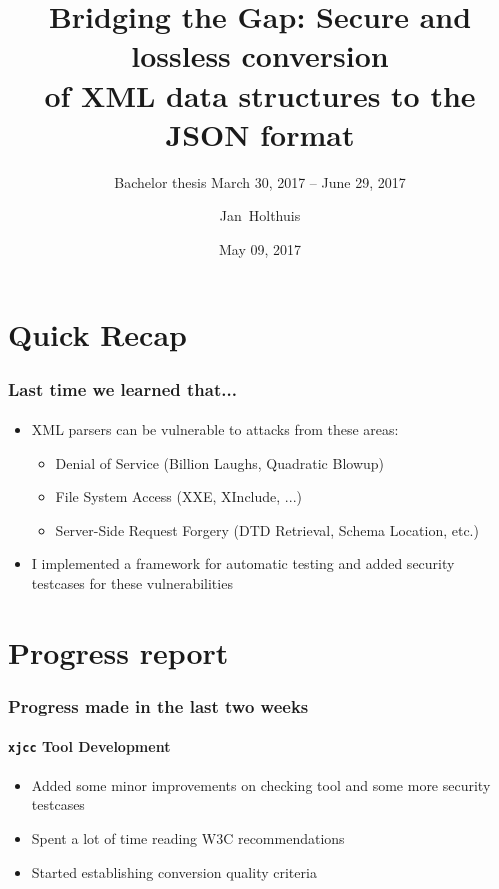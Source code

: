 \documentclass[
    alternativetitlepage=alternativ,
    cornerlogo=hgi_nds_logo2,
    sectionoverview,
]{rubpresentation}
\title[XML/JSON conversions]
{Bridging the Gap: Secure and lossless conversion\\ of XML data structures to the JSON format}
\subtitle{\small Bachelor thesis \hspace{3mm}{\scriptsize $\blacksquare$}\hspace{3mm} March 30, 2017 -- June 29, 2017}
\author[Holthuis]{Jan~Holthuis}
\institute[Advisors]
{%
Advisors: Dennis Felsch \& Paul Rösler
}
\date{May 09, 2017}
\begin{document}
\frame[plain]{\titlepage}




\section{Quick Recap}

\begin{frame}
    \frametitle{Last time we learned that...}
    \framesubtitle{}
    \begin{itemize}
        \item{} XML parsers can be vulnerable to attacks from these areas:
        \begin{itemize}
            \item{} Denial of Service (Billion Laughs, Quadratic Blowup)
            \item{} File System Access (XXE, XInclude, ...)
            \item{} Server-Side Request Forgery (DTD Retrieval, Schema Location, etc.)
        \end{itemize}
        \item{} I implemented a framework for automatic testing and added security testcases for these vulnerabilities
    \end{itemize}

\end{frame}


\section{Progress report}

\begin{frame}
    \frametitle{Progress made in the last two weeks}
    \framesubtitle{\texttt{xjcc} Tool Development}
    \begin{itemize}
        \item{} Added some minor improvements on checking tool and some more
            security testcases
        \item{} Spent a lot of time reading W3C recommendations
        \item{} Started establishing conversion quality criteria
    \end{itemize}
\end{frame}
\end{document}
